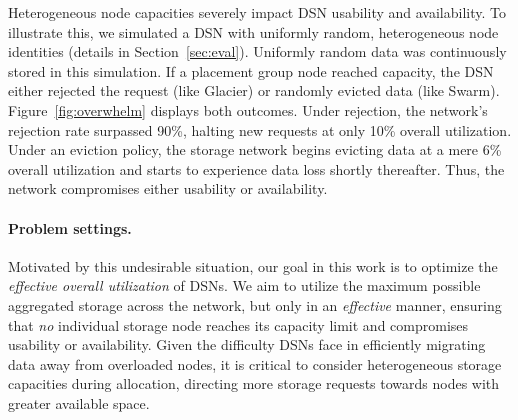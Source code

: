 Heterogeneous node capacities severely impact DSN usability and availability.
To illustrate this, we simulated a DSN with uniformly random, heterogeneous node identities (details in Section~\ref{sec:eval}).
Uniformly random data was continuously stored in this simulation.
If a placement group node reached capacity, the DSN either rejected the request (like Glacier) or randomly evicted data (like Swarm).
Figure~\ref{fig:overwhelm} displays both outcomes.
Under rejection, the network's rejection rate surpassed 90\%, halting new requests at only 10\% overall utilization.
Under an eviction policy, the storage network begins evicting data at a mere 6\% overall utilization and starts to experience data loss shortly thereafter.
Thus, the network compromises either usability or availability.

\paragraph{Problem settings.}
Motivated by this undesirable situation, our goal in this work is to optimize the \emph{effective overall utilization} of DSNs.
We aim to utilize the maximum possible aggregated storage across the network, but only in an \emph{effective} manner, ensuring that \emph{no} individual storage node reaches its capacity limit and compromises usability or availability.
Given the difficulty DSNs face in efficiently migrating data away from overloaded nodes, it is critical to consider heterogeneous storage capacities during allocation, directing more storage requests towards nodes with greater available space.

